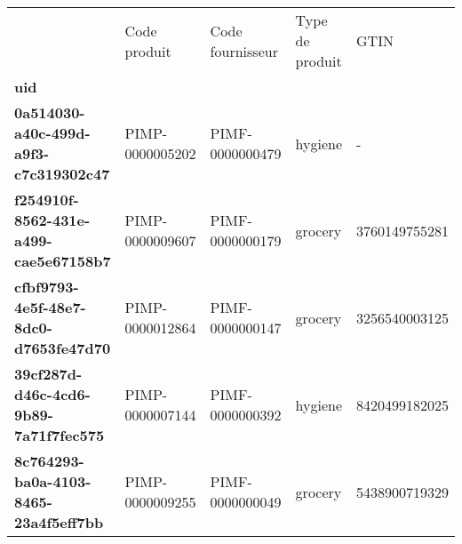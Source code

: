 \begin{tabularx}{\linewidth}{lXXXX}
\toprule
{} &     Code produit & Code fournisseur & Type de produit &           GTIN \\
\textbf{uid                                 } &                  &                  &                 &                \\
\midrule
\textbf{0a514030-a40c-499d-a9f3-c7c319302c47} &  PIMP-0000005202 &  PIMF-0000000479 &         hygiene &              - \\
\textbf{f254910f-8562-431e-a499-cae5e67158b7} &  PIMP-0000009607 &  PIMF-0000000179 &         grocery &  3760149755281 \\
\textbf{cfbf9793-4e5f-48e7-8dc0-d7653fe47d70} &  PIMP-0000012864 &  PIMF-0000000147 &         grocery &  3256540003125 \\
\textbf{39cf287d-d46c-4cd6-9b89-7a71f7fec575} &  PIMP-0000007144 &  PIMF-0000000392 &         hygiene &  8420499182025 \\
\textbf{8c764293-ba0a-4103-8465-23a4f5eff7bb} &  PIMP-0000009255 &  PIMF-0000000049 &         grocery &  5438900719329 \\
\bottomrule
\end{tabularx}
